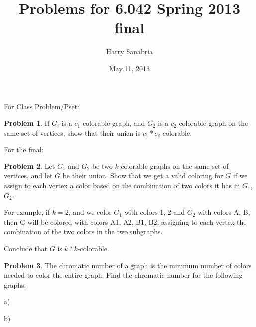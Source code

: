 \documentclass{amsart}
\title{Problems for 6.042 Spring 2013 final}
\author{Harry Sanabria}
\date{May 11, 2013}
\theoremstyle{definition}
\newtheorem{problem}{Problem}
\theoremstyle{remark}
\begin{document}
\maketitle

For Class Problem/Pset:
\begin{problem}
If $G_i$ is a $c_1$ colorable graph, and $G_2$ is a $c_2$ colorable
graph on the same set of vertices, show that their union is $c_1*c_2$
colorable.
\end{problem}
\setcounter{problem}{0}

For the final:
\begin{problem}
Let $G_1$ and $G_2$ be two $k$-colorable graphs on the same set of
vertices, and let $G$ be their union.  Show that we get a valid
coloring for $G$ if we assign to each vertex a color based on the
combination of two colors it has in $G_1$, $G_2$.

For example, if $k=2$, and we color $G_1$ with colors 1, 2 and $G_2$
with colors A, B, then G will be colored with colors A1, A2, B1, B2,
assigning to each vertex the combination of the two colors in the two
subgraphs.

Conclude that $G$ is $k*k$-colorable.
\end{problem}

\begin{problem}
The chromatic number of a graph is the minimum number of colors needed
to color the entire graph.  Find the chromatic number for the
following graphs:
\end{problem}
a)
b)
\end{document}
